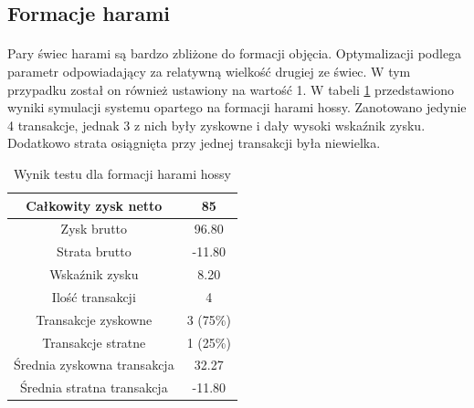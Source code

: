 \documentclass[pdflatex,11pt]{aghdpl}
\begin{document}
\subsection{Formacje harami}
\paragraph{}
Pary świec harami są bardzo zbliżone do formacji objęcia. Optymalizacji podlega parametr odpowiadający za relatywną wielkość drugiej ze świec. W tym przypadku został on również ustawiony na wartość 1. W tabeli \ref{raport_harami_hossy} przedstawiono wyniki symulacji systemu opartego na formacji harami hossy. Zanotowano jedynie 4 transakcje, jednak 3 z nich były zyskowne i dały wysoki wskaźnik zysku. Dodatkowo strata osiągnięta przy jednej transakcji była niewielka. 
\begin{table}[h!]
\caption{Wynik testu dla formacji harami hossy}
\begin{center}
\begin{tabular}{|c|c|}
\hline 
Całkowity zysk netto & 85\\
\hline
Zysk brutto & 96.80 \\
\hline
Strata brutto & -11.80 \\
\hline
Wskaźnik zysku & 8.20 \\
\hline
\hline
Ilość transakcji & 4 \\
\hline
Transakcje zyskowne & 3 (75\%) \\
\hline
Transakcje stratne & 1 (25\%) \\
\hline
\hline
Średnia zyskowna transakcja & 32.27 \\
\hline
Średnia stratna transakcja & -11.80 \\
\hline
\end{tabular} 
\label{raport_harami_hossy}
\end{center}
\end{table}
\end{document}
